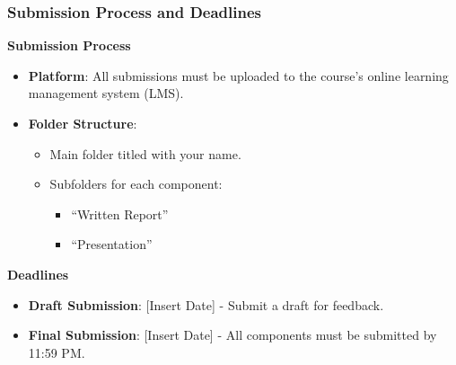 \documentclass[aspectratio=169]{beamer}
\begin{document}
\begin{frame}[fragile]
    \frametitle{Submission Process and Deadlines}
    \textbf{Submission Process}
    \begin{itemize}
        \item \textbf{Platform}: All submissions must be uploaded to the course’s online learning management system (LMS).
        \item \textbf{Folder Structure}:
        \begin{itemize}
            \item Main folder titled with your name.
            \item Subfolders for each component:
            \begin{itemize}
                \item “Written Report”
                \item “Presentation”
            \end{itemize}
        \end{itemize}
    \end{itemize}

    \textbf{Deadlines}
    \begin{itemize}
        \item \textbf{Draft Submission}: [Insert Date] - Submit a draft for feedback.
        \item \textbf{Final Submission}: [Insert Date] - All components must be submitted by 11:59 PM.
    \end{itemize}
\end{frame}
\end{document}
